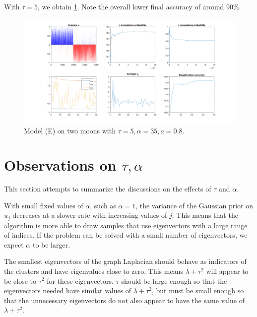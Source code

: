 \documentclass{siamart1116}
\begin{document}
            With $\tau = 5$, we obtain \cref{fig:model_e_mnist_t=5}. Note the overall lower final accuracy of around $90\%$.
            \begin{figure}[!htb]
            \caption{\label{fig:model_e_mnist_t=5}Model (E) on two moons with $\tau=5,\alpha=35,a=0.8$.}
            \includegraphics[width=\linewidth]{mnist/learn_v/t=5.png}
            \end{figure}

\section{Observations on $\tau, \alpha$}
    This section attempts to summarize the discussions on the effects of $\tau$ and $\alpha$.

    With small fixed values of $\alpha$, such as $\alpha=1$, the variance of the Gaussian prior on $u_j$ decreases at a slower rate with increasing values of $j$. This means that the algorithm is more able to draw samples that use eigenvectors with a large range of indices. If the problem can be solved with a small number of eigenvectors, we expect $\alpha$ to be larger.

    The smallest eigenvectors of the graph Laplacian should behave as indicators of the clusters and have eigenvalues close to zero. This means $\lambda + \tau^2$ will appear to be close to $\tau^2$ for these eigenvectors. $\tau$ should be large enough so that the eigenvectors needed have similar values of $\lambda + \tau^2$, but must be small enough so that the unnecessary eigenvectors do not also appear to have the same value of $\lambda + \tau^2$.



\end{document}
